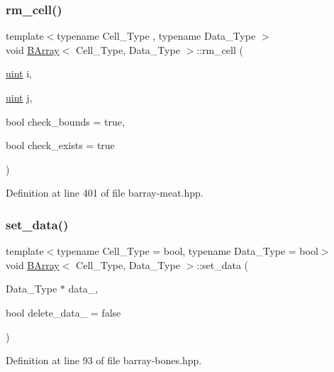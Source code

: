 \subsubsection{\texorpdfstring{rm\+\_\+cell()}{rm\_cell()}}
{\footnotesize\ttfamily template$<$typename Cell\+\_\+\+Type , typename Data\+\_\+\+Type $>$ \\
void \hyperlink{class_b_array}{B\+Array}$<$ Cell\+\_\+\+Type, Data\+\_\+\+Type $>$\+::rm\+\_\+cell (\begin{DoxyParamCaption}\item[{\hyperlink{typedefs_8hpp_a91ad9478d81a7aaf2593e8d9c3d06a14}{uint}}]{i,  }\item[{\hyperlink{typedefs_8hpp_a91ad9478d81a7aaf2593e8d9c3d06a14}{uint}}]{j,  }\item[{bool}]{check\+\_\+bounds = {\ttfamily true},  }\item[{bool}]{check\+\_\+exists = {\ttfamily true} }\end{DoxyParamCaption})\hspace{0.3cm}{\ttfamily [inline]}}



Definition at line 401 of file barray-\/meat.\+hpp.

\mbox{\label{class_b_array_accf44b49caa7746a462a3ac9b6024cfc}} 
\subsubsection{\texorpdfstring{set\+\_\+data()}{set\_data()}}
{\footnotesize\ttfamily template$<$typename Cell\+\_\+\+Type = bool, typename Data\+\_\+\+Type = bool$>$ \\
void \hyperlink{class_b_array}{B\+Array}$<$ Cell\+\_\+\+Type, Data\+\_\+\+Type $>$\+::set\+\_\+data (\begin{DoxyParamCaption}\item[{Data\+\_\+\+Type $\ast$}]{data\+\_\+,  }\item[{bool}]{delete\+\_\+data\+\_\+ = {\ttfamily false} }\end{DoxyParamCaption})\hspace{0.3cm}{\ttfamily [inline]}}



Definition at line 93 of file barray-\/bones.\+hpp.

\mbox{\label{class_b_array_afb7976f67770b850922c1a7e1d6b07cc}} 
